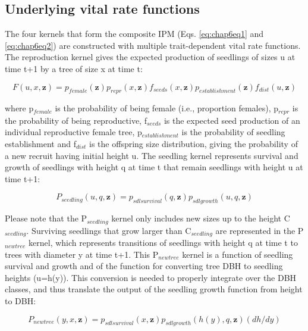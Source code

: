 \documentclass[b5paper,justified]{tufte-book} %
\begin{document}
\begin{fullwidth}
\subsection{Underlying vital rate functions}
	The four kernels that form the composite IPM (Eqs. \ref{eq:chap6eq1} and \ref{eq:chap6eq2}) are constructed with multiple trait-dependent vital rate functions. The reproduction kernel gives the expected production of seedlings of sizes u at time t+1 by a tree of size x at time t:

\begin{equation}
F (u,x,\textbf{z})=p_{female} (\textbf{z}) p_{repr}(x,\textbf{z}) f_{seeds} (x,\textbf{z}) p_{establishment} (\textbf{z}) f_{dist}(u,\textbf{z})
\label{eq:chap6eq3} 
\end{equation}

where p$_{female}$ is the probability of being female (i.e., proportion females), p$_{repr}$ is the probability of being reproductive, f$_{seeds}$ is the expected seed production of an individual reproductive female tree, p$_{establishment}$ is the probability of seedling establishment and f$_{dist}$ is the offspring size distribution, giving the probability of a new recruit having initial height u. 
	The seedling kernel represents survival and growth of seedlings with height q at time t that remain seedlings with height u at time t+1: 
	
\begin{equation}
P_{seedling}(u,q,\textbf{z})=p_{sdl survival}(q,\textbf{z}) p_{sdl growth}(u,q,\textbf{z})
\label{eq:chap6eq4} 
\end{equation}

Please note that the P$_{seedling}$ kernel only includes new sizes up to the height C$_{seedling}$. Surviving seedlings that grow larger than C$_{seedling}$ are represented in the P$_{new tree}$ kernel, which represents transitions of seedlings with height q at time t to trees with diameter y at time t+1. This P$_{new tree}$ kernel is a function of seedling survival and growth and of the function for converting tree DBH to seedling heights (u=h(y)). This conversion is needed to properly integrate over the DBH classes, and thus translate the output of the seedling growth function from height to DBH:

\begin{equation}
P_{new tree}  (y,x,\textbf{z})=p_{sdl survival} (x,\textbf{z}) p_{sdl growth} (h(y),q,\textbf{z}) (dh/dy)
\label{eq:chap6eq5} 
\end{equation}


\end{fullwidth}
\end{document}
